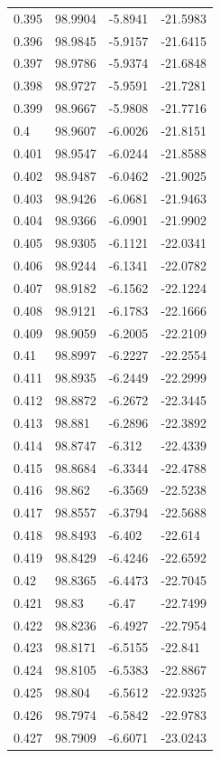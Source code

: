 \begin{tabular}{llll}
0.395 & 98.9904 & -5.8941 & -21.5983 \\
0.396 & 98.9845 & -5.9157 & -21.6415 \\
0.397 & 98.9786 & -5.9374 & -21.6848 \\
0.398 & 98.9727 & -5.9591 & -21.7281 \\
0.399 & 98.9667 & -5.9808 & -21.7716 \\
0.4 & 98.9607 & -6.0026 & -21.8151 \\
0.401 & 98.9547 & -6.0244 & -21.8588 \\
0.402 & 98.9487 & -6.0462 & -21.9025 \\
0.403 & 98.9426 & -6.0681 & -21.9463 \\
0.404 & 98.9366 & -6.0901 & -21.9902 \\
0.405 & 98.9305 & -6.1121 & -22.0341 \\
0.406 & 98.9244 & -6.1341 & -22.0782 \\
0.407 & 98.9182 & -6.1562 & -22.1224 \\
0.408 & 98.9121 & -6.1783 & -22.1666 \\
0.409 & 98.9059 & -6.2005 & -22.2109 \\
0.41 & 98.8997 & -6.2227 & -22.2554 \\
0.411 & 98.8935 & -6.2449 & -22.2999 \\
0.412 & 98.8872 & -6.2672 & -22.3445 \\
0.413 & 98.881 & -6.2896 & -22.3892 \\
0.414 & 98.8747 & -6.312 & -22.4339 \\
0.415 & 98.8684 & -6.3344 & -22.4788 \\
0.416 & 98.862 & -6.3569 & -22.5238 \\
0.417 & 98.8557 & -6.3794 & -22.5688 \\
0.418 & 98.8493 & -6.402 & -22.614 \\
0.419 & 98.8429 & -6.4246 & -22.6592 \\
0.42 & 98.8365 & -6.4473 & -22.7045 \\
0.421 & 98.83 & -6.47 & -22.7499 \\
0.422 & 98.8236 & -6.4927 & -22.7954 \\
0.423 & 98.8171 & -6.5155 & -22.841 \\
0.424 & 98.8105 & -6.5383 & -22.8867 \\
0.425 & 98.804 & -6.5612 & -22.9325 \\
0.426 & 98.7974 & -6.5842 & -22.9783 \\
0.427 & 98.7909 & -6.6071 & -23.0243 \\

\end{tabular}
